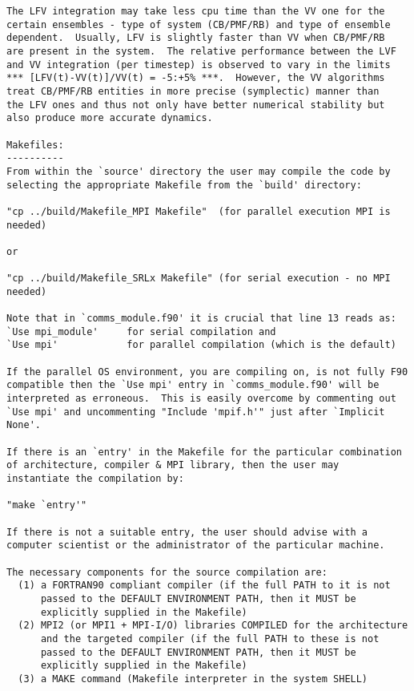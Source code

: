 \begin{verbatim}
The LFV integration may take less cpu time than the VV one for the
certain ensembles - type of system (CB/PMF/RB) and type of ensemble
dependent.  Usually, LFV is slightly faster than VV when CB/PMF/RB
are present in the system.  The relative performance between the LVF
and VV integration (per timestep) is observed to vary in the limits
*** [LFV(t)-VV(t)]/VV(t) = -5:+5% ***.  However, the VV algorithms
treat CB/PMF/RB entities in more precise (symplectic) manner than
the LFV ones and thus not only have better numerical stability but
also produce more accurate dynamics.

Makefiles:
----------
From within the `source' directory the user may compile the code by
selecting the appropriate Makefile from the `build' directory:

"cp ../build/Makefile_MPI Makefile"  (for parallel execution MPI is needed)

or

"cp ../build/Makefile_SRLx Makefile" (for serial execution - no MPI needed)

Note that in `comms_module.f90' it is crucial that line 13 reads as:
`Use mpi_module'     for serial compilation and
`Use mpi'            for parallel compilation (which is the default)

If the parallel OS environment, you are compiling on, is not fully F90
compatible then the `Use mpi' entry in `comms_module.f90' will be
interpreted as erroneous.  This is easily overcome by commenting out
`Use mpi' and uncommenting "Include 'mpif.h'" just after `Implicit None'.

If there is an `entry' in the Makefile for the particular combination
of architecture, compiler & MPI library, then the user may
instantiate the compilation by:

"make `entry'"

If there is not a suitable entry, the user should advise with a
computer scientist or the administrator of the particular machine.

The necessary components for the source compilation are:
  (1) a FORTRAN90 compliant compiler (if the full PATH to it is not
      passed to the DEFAULT ENVIRONMENT PATH, then it MUST be
      explicitly supplied in the Makefile)
  (2) MPI2 (or MPI1 + MPI-I/O) libraries COMPILED for the architecture
      and the targeted compiler (if the full PATH to these is not
      passed to the DEFAULT ENVIRONMENT PATH, then it MUST be
      explicitly supplied in the Makefile)
  (3) a MAKE command (Makefile interpreter in the system SHELL)


\end{verbatim}
